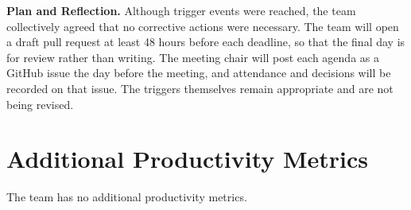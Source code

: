 \documentclass{article}
\begin{document}
\textbf{Plan and Reflection.} Although trigger events were reached, the team collectively
agreed that no corrective actions were necessary. 
The team will open a draft pull request at least 48 hours before
each deadline, so that the final day is for review rather than writing. The
meeting chair will post each agenda as a GitHub issue the day before the
meeting, and attendance and decisions will be recorded on that issue. The
triggers themselves remain appropriate and are not being revised.

\section{Additional Productivity Metrics}

The team has no additional productivity metrics.
\end{document}
